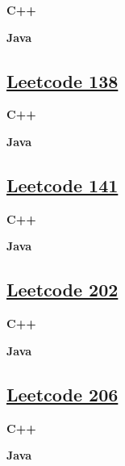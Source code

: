 \textbf{C++}\par


\textbf{Java}\par



\subsection{\href{https://leetcode-cn.com/}{Leetcode 138}}\label{app:codelist:leetcode:138}

\textbf{C++}\par


\textbf{Java}\par



\subsection{\href{https://leetcode-cn.com/}{Leetcode 141}}\label{app:codelist:leetcode:141}

\textbf{C++}\par


\textbf{Java}\par



\subsection{\href{https://leetcode-cn.com/}{Leetcode 202}}\label{app:codelist:leetcode:202}

\textbf{C++}\par


\textbf{Java}\par



\subsection{\href{https://leetcode-cn.com/}{Leetcode 206}}\label{app:codelist:leetcode:206}

\textbf{C++}\par


\textbf{Java}\par



